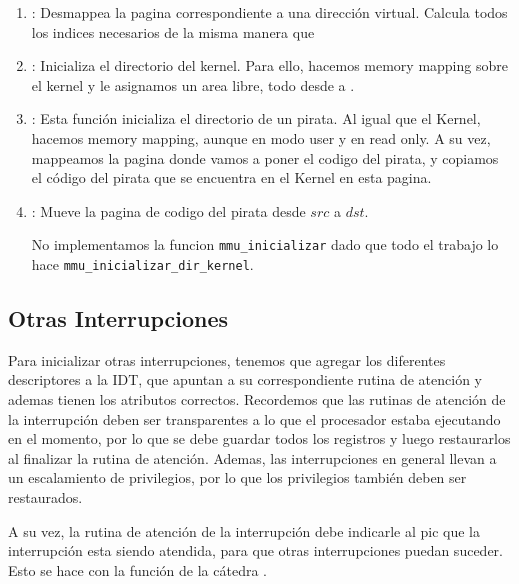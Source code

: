 \begin{enumerate}
\item {}: Desmappea la pagina correspondiente a una dirección virtual. Calcula todos los indices necesarios de la misma manera que 

\item {}: Inicializa el directorio del kernel. Para ello, hacemos memory mapping sobre el kernel y le asignamos un area libre, todo desde  a .

\item {}: Esta función inicializa el directorio de un pirata. Al igual que el Kernel, hacemos memory mapping, aunque en modo user y en read only. A su vez, mappeamos la pagina donde vamos a poner el codigo del pirata, y copiamos el código del pirata que se encuentra en el Kernel en esta pagina.

\item {}: Mueve la pagina de codigo del pirata desde $src$ a $dst$.

No implementamos la funcion \texttt{mmu\_inicializar} dado que todo el trabajo lo hace \texttt{mmu\_inicializar\_dir\_kernel}.

\end{enumerate}

\subsection{Otras Interrupciones}

Para inicializar otras interrupciones, tenemos que agregar los diferentes descriptores a la IDT, que apuntan a su correspondiente rutina de atención y ademas tienen los atributos correctos. Recordemos que las rutinas de atención de la interrupción deben ser transparentes a lo que el procesador estaba ejecutando en el momento, por lo que se debe guardar todos los registros y luego restaurarlos al finalizar la rutina de atención. Ademas, las interrupciones en general llevan a un escalamiento de privilegios, por lo que los privilegios también deben ser restaurados.

A su vez, la rutina de atención de la interrupción debe indicarle al pic que la interrupción esta siendo atendida, para que otras interrupciones puedan suceder. Esto se hace con la función de la cátedra .

